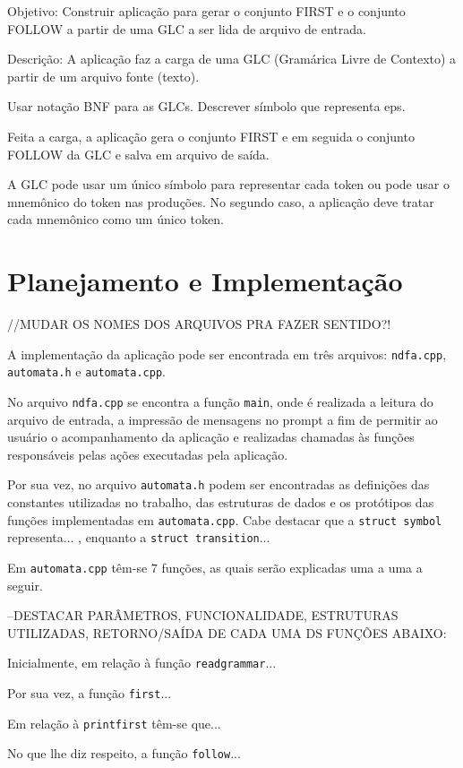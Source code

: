 \documentclass[12pt]{article}
\begin{document}
Objetivo:
Construir aplicação para gerar o conjunto FIRST e o conjunto FOLLOW a partir de uma GLC a ser lida de arquivo de entrada.

Descrição:
A aplicação faz a carga de uma GLC (Gramárica Livre de Contexto) a partir de um arquivo fonte (texto).

Usar notação BNF para as GLCs. Descrever símbolo que representa eps.

Feita a carga, a aplicação gera o conjunto FIRST e em seguida o conjunto FOLLOW da GLC e salva em arquivo de saída.

A GLC pode usar um único símbolo para representar cada token ou pode usar o mnemônico do token nas produções. No segundo caso, a aplicação deve tratar cada mnemônico como um único token.



\section{Planejamento e Implementação}
\label{4}
//MUDAR OS NOMES DOS ARQUIVOS PRA FAZER SENTIDO?!


A implementação da aplicação pode ser encontrada em três arquivos: \texttt{ndfa.cpp}, \texttt{automata.h} e \texttt{automata.cpp}.

No arquivo \texttt{ndfa.cpp} se encontra a função \texttt{main}, onde é realizada a leitura do arquivo de entrada, a impressão de mensagens no prompt a fim de permitir ao usuário o acompanhamento da aplicação e realizadas chamadas às funções responsáveis pelas ações executadas pela aplicação.

Por sua vez, no arquivo \texttt{automata.h} podem ser encontradas as definições das constantes utilizadas no trabalho, das estruturas de dados e os protótipos das funções implementadas em \texttt{automata.cpp}. Cabe destacar que a \texttt{struct symbol} representa... , enquanto a \texttt{struct transition}...

Em \texttt{automata.cpp} têm-se  $7$ funções, as quais serão explicadas uma a uma a seguir.

--DESTACAR PARÂMETROS, FUNCIONALIDADE, ESTRUTURAS UTILIZADAS, RETORNO/SAÍDA DE CADA UMA DS FUNÇÕES ABAIXO:

Inicialmente, em relação à função \texttt{readgrammar}...

Por sua vez, a função \texttt{first}...

Em relação à \texttt{printfirst} têm-se que...

No que lhe diz respeito, a função \texttt{follow}...
\end{document}
